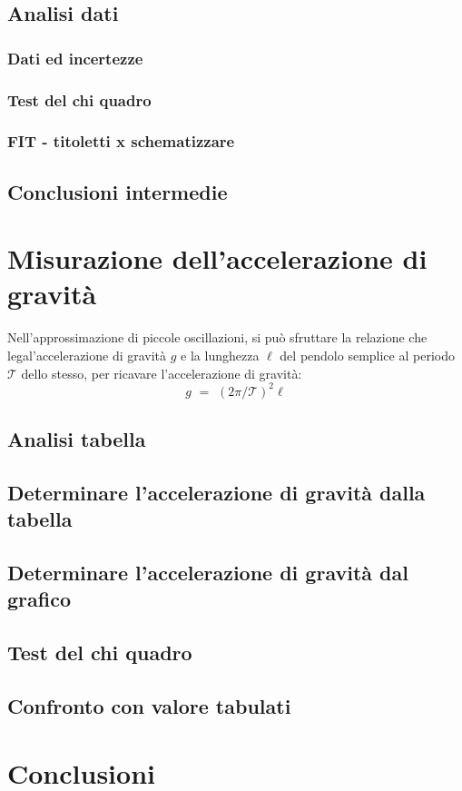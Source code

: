 \documentclass[11pt, twoside, a4paper]{article}
\begin{document}
	\subsection{Analisi dati}
		\subsubsection{Dati ed incertezze}
		
		\subsubsection{Test del chi quadro}
		
		\subsubsection{FIT - titoletti x schematizzare}
		
	\subsection{Conclusioni intermedie}
	
\newpage
\section{Misurazione dell'accelerazione di gravità}
%
Nell'approssimazione di piccole oscillazioni, si può sfruttare la relazione che legal'accelerazione di gravità $g$ e la lunghezza $\ell$ del pendolo semplice al periodo $\mathcal{T}$ dello stesso, per ricavare l'accelerazione di gravità:
\begin{equation}
	g \,\, = \,\, (2 \pi / \mathcal{T})^2 \ell
\end{equation}
	\subsection{Analisi tabella}
	
	\subsection{Determinare l'accelerazione di gravità dalla tabella}
	
	\subsection{Determinare l'accelerazione di gravità dal grafico}
	
	\subsection{Test del chi quadro}
	
	\subsection{Confronto con valore tabulati}
	

\newpage
\section{Conclusioni}

\end{document}
